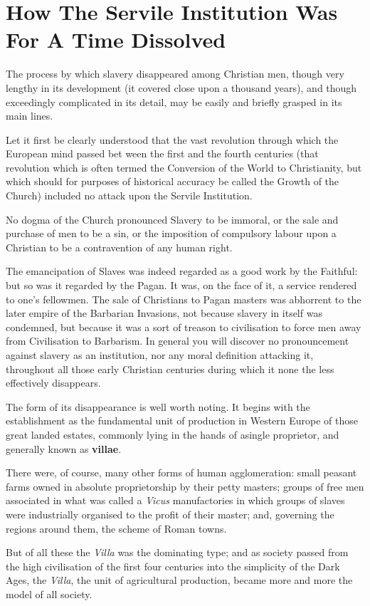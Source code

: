 \documentclass{book}
\newcommand\mdstrong[1]{\textbf{#1}}
\begin{document}
\chapter{How The Servile Institution Was For A Time Dissolved}
\label{chapter-3}
The process by which slavery disappeared among Christian men, though very lengthy in its development (it covered close upon a thousand years), and though exceedingly complicated in its detail, may be easily and briefly grasped in its main lines.

Let it first be clearly understood that the vast revolution through which the European mind passed bet ween the first and the fourth centuries (that revolution which is often termed the Conversion of the World to Christianity, but which should for purposes of historical accuracy be called the Growth of the Church) included no attack upon the Servile Institution.

No dogma of the Church pronounced Slavery to be immoral, or the sale and purchase of men to be a sin, or the imposition of compulsory labour upon a Christian to be a contravention of any human right.

The emancipation of Slaves was indeed regarded as a good work by the Faithful: but so was it regarded by the Pagan. It was, on the face of it, a service rendered to one’s fellowmen. The sale of Christians to Pagan masters was abhorrent to the later empire of the Barbarian Invasions, not because slavery in itself was condemned, but because it was a sort of treason to civilisation to force men away from Civilisation to Barbarism. In general you will discover no pronouncement against slavery as an institution, nor any moral definition attacking it, throughout all those early Christian centuries during which it none the less effectively disappears.

The form of its disappearance is well worth noting. It begins with the establishment as the fundamental unit of production in Western Europe of those great landed estates, commonly lying in the hands of asingle proprietor, and generally known as \mdstrong{villae}.

There were, of course, many other forms of human agglomeration: small peasant farms owned in absolute proprietorship by their petty masters; groups of free men associated in what was called a \emph{Vicus} manufactories in which groups of slaves were industrially organised to the profit of their master; and, governing the regions around them, the scheme of Roman towns.

But of all these the \emph{Villa} was the dominating type; and as society passed from the high civilisation of the first four centuries into the simplicity of the Dark Ages, the \emph{Villa}, the unit of agricultural production, became more and more the model of all society.
\end{document}
